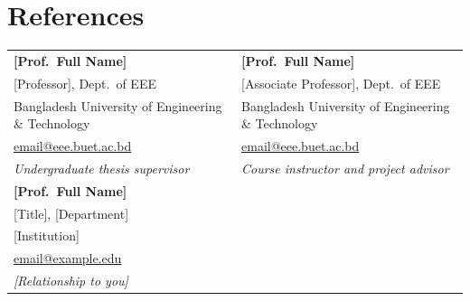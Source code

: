 \documentclass[11pt,letterpaper]{article}   %
\begin{document}
\section{References}
\vspace{2pt}
\noindent
\begin{tabularx}{\textwidth}{@{}XX@{}}
\textbf{[Prof.\ Full Name]} & \textbf{[Prof.\ Full Name]}\\
{[Professor]}, Dept.\ of EEE & {[Associate Professor]}, Dept.\ of EEE\\
Bangladesh University of Engineering \& Technology & Bangladesh University of Engineering \& Technology\\
\href{mailto:email@eee.buet.ac.bd}{email@eee.buet.ac.bd} & \href{mailto:email@eee.buet.ac.bd}{email@eee.buet.ac.bd}\\
\textit{Undergraduate thesis supervisor} & \textit{Course instructor and project advisor}\\[10pt]
\textbf{[Prof.\ Full Name]} & \\
{[Title]}, {[Department]} & \\
{[Institution]} & \\
\href{mailto:email@example.edu}{email@example.edu} & \\
\textit{[Relationship to you]} & \\
\end{tabularx}
\end{document}
